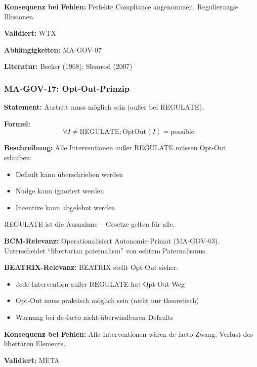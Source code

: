 \textbf{Konsequenz bei Fehlen:}
Perfekte Compliance angenommen. Regulierungs-Illusionen.

\textbf{Validiert:} WTX

\textbf{Abhängigkeiten:} MA-GOV-07

\textbf{Literatur:} Becker (1968); Slemrod (2007)


\subsubsection*{MA-GOV-17: Opt-Out-Prinzip}

\textbf{Statement:} Austritt muss möglich sein (außer bei REGULATE).

\textbf{Formel:}
\begin{equation}
\forall I \neq \text{REGULATE}: \text{OptOut}(I) = \text{possible}
\end{equation}

\textbf{Beschreibung:}
Alle Interventionen außer REGULATE müssen Opt-Out erlauben:
\begin{itemize}
    \item Default kann überschrieben werden
    \item Nudge kann ignoriert werden
    \item Incentive kann abgelehnt werden
\end{itemize}
REGULATE ist die Ausnahme -- Gesetze gelten für alle.

\textbf{BCM-Relevanz:}
Operationalisiert Autonomie-Primat (MA-GOV-03). Unterscheidet ``libertarian paternalism'' von echtem Paternalismus.

\textbf{BEATRIX-Relevanz:}
BEATRIX stellt Opt-Out sicher:
\begin{itemize}
    \item Jede Intervention außer REGULATE hat Opt-Out-Weg
    \item Opt-Out muss praktisch möglich sein (nicht nur theoretisch)
    \item Warnung bei de-facto nicht-überwindbaren Defaults
\end{itemize}

\textbf{Konsequenz bei Fehlen:}
Alle Interventionen wären de facto Zwang. Verlust des libertären Elements.

\textbf{Validiert:} META

